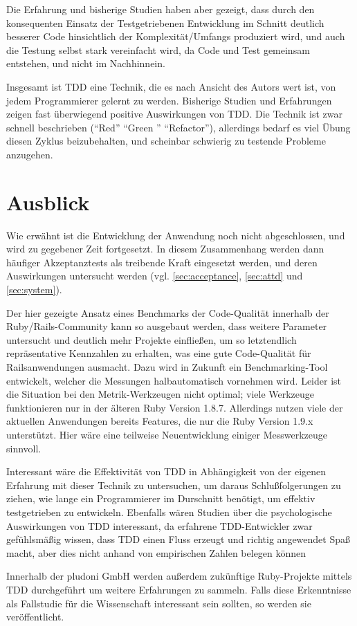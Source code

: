 Die Erfahrung und bisherige Studien haben aber gezeigt, dass durch den konsequenten Einsatz der Testgetriebenen Entwicklung im Schnitt deutlich besserer Code hinsichtlich der Komplexität/Umfangs produziert wird, und auch die Testung selbst stark vereinfacht wird, da Code und Test gemeinsam entstehen, und nicht im Nachhinnein.

Insgesamt ist TDD eine Technik, die es nach Ansicht des Autors wert ist, von jedem Programmierer gelernt zu werden. Bisherige Studien und Erfahrungen zeigen fast überwiegend positive Auswirkungen von TDD. Die Technik ist zwar schnell beschrieben ("`Red"' "`Green "' "`Refactor"'), allerdings bedarf es viel Übung diesen Zyklus beizubehalten, und scheinbar schwierig zu testende Probleme anzugehen.

\section{Ausblick}
Wie erwähnt ist die Entwicklung der Anwendung noch nicht abgeschlossen, und wird zu gegebener Zeit fortgesetzt. In diesem Zusammenhang werden dann häufiger Akzeptanztests als treibende Kraft eingesetzt werden, und deren Auswirkungen untersucht werden (vgl. \ref{sec:acceptance}, \ref{sec:attd} und \ref{sec:system}).

Der hier gezeigte Ansatz eines Benchmarks der Code-Qualität innerhalb der Ruby/Rails\hyp{}Community kann so ausgebaut werden, dass weitere Parameter untersucht und deutlich mehr Projekte einfließen, um so letztendlich repräsentative Kennzahlen zu erhalten, was eine gute Code-Qualität für Railsanwendungen ausmacht. Dazu wird in Zukunft ein Benchmarking-Tool entwickelt, welcher die Messungen halbautomatisch vornehmen wird. Leider ist die Situation bei den Metrik-Werkzeugen nicht optimal; viele Werkzeuge funktionieren nur in der älteren Ruby Version 1.8.7. Allerdings nutzen viele der aktuellen Anwendungen bereits Features, die nur die Ruby Version 1.9.x unterstützt. Hier wäre eine teilweise Neuentwicklung einiger Messwerkzeuge sinnvoll.

Interessant wäre die Effektivität von TDD in Abhängigkeit von der eigenen Erfahrung mit dieser Technik zu untersuchen, um daraus Schlußfolgerungen zu ziehen, wie lange ein Programmierer im Durschnitt benötigt, um effektiv testgetrieben zu entwickeln. Ebenfalls wären Studien über die psychologische Auswirkungen von TDD interessant, da erfahrene TDD-Entwickler zwar gefühlsmäßig wissen, dass TDD einen Fluss erzeugt und richtig angewendet Spaß macht, aber dies nicht anhand von empirischen Zahlen belegen können

Innerhalb der pludoni GmbH werden außerdem zukünftige Ruby-Projekte mittels TDD durchgeführt um weitere Erfahrungen zu sammeln. Falls diese Erkenntnisse als Fallstudie für die Wissenschaft interessant sein sollten, so werden sie veröffentlicht.


